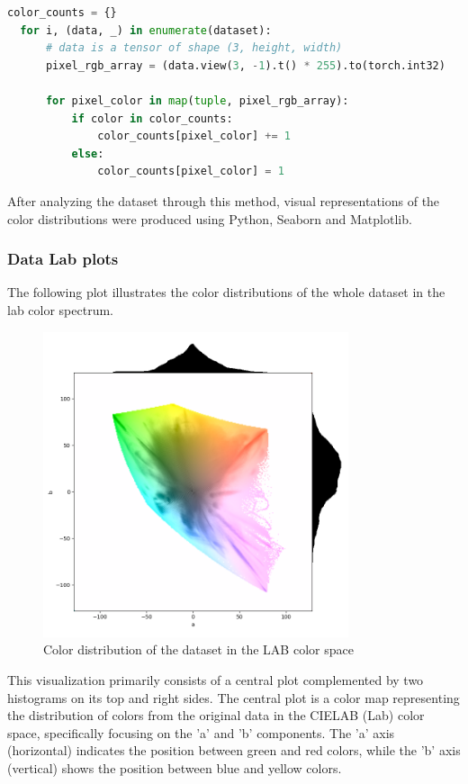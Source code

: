\begin{lstlisting}[language=Python]
  color_counts = {} 
  for i, (data, _) in enumerate(dataset):
      # data is a tensor of shape (3, height, width) 
      pixel_rgb_array = (data.view(3, -1).t() * 255).to(torch.int32)
      
      for pixel_color in map(tuple, pixel_rgb_array):
          if color in color_counts:
              color_counts[pixel_color] += 1
          else:
              color_counts[pixel_color] = 1
\end{lstlisting}

    After analyzing the dataset through this method, visual representations of the color distributions were produced using Python, Seaborn and Matplotlib. 
    
    \subsubsection{Data Lab plots}

    The following plot illustrates the color distributions of the whole dataset in the lab color spectrum.


    \begin{figure}[H]
        \centering
        \includegraphics[width=0.8\textwidth]{../code/dataAnalysis/plots/lab/DataCombined_lab_log.png}
        \caption{Color distribution of the dataset in the LAB color space}
        \label{fig:example}
    \end{figure}
    
    This visualization primarily consists of a central plot complemented by two histograms on its top and right sides. The central plot is a color map representing the distribution of colors from the original data in the CIELAB (Lab) color space, specifically focusing on the 'a' and 'b' components. The 'a' axis (horizontal) indicates the position between green and red colors, while the 'b' axis (vertical) shows the position between blue and yellow colors.

